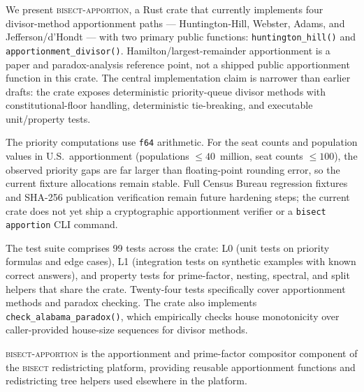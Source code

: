We present \textsc{bisect-apportion}, a Rust crate that currently implements
four divisor-method apportionment paths --- Huntington-Hill, Webster, Adams,
and Jefferson/d'Hondt --- with two primary public functions:
\texttt{huntington\_hill()} and \texttt{apportionment\_divisor()}.
Hamilton/largest-remainder apportionment is a paper and paradox-analysis
reference point, not a shipped public apportionment function in this crate.
The central implementation claim is narrower than earlier drafts: the crate
exposes deterministic priority-queue divisor methods with constitutional-floor
handling, deterministic tie-breaking, and executable unit/property tests.

The priority computations use \texttt{f64} arithmetic.
For the seat counts and population values in U.S.\ apportionment
(populations $\leq 40$~million, seat counts $\leq 100$), the observed
priority gaps are far larger than floating-point rounding error, so the
current fixture allocations remain stable.  Full Census Bureau regression
fixtures and SHA-256 publication verification remain future hardening steps;
the current crate does not yet ship a cryptographic apportionment verifier or
a \texttt{bisect apportion} CLI command.

The test suite comprises 99 tests across the crate:
L0 (unit tests on priority formulas and edge cases),
L1 (integration tests on synthetic examples with known correct answers),
and property tests for prime-factor, nesting, spectral, and split helpers that
share the crate.  Twenty-four tests specifically cover apportionment methods
and paradox checking.
The crate also implements \texttt{check\_alabama\_paradox()},
which empirically checks house monotonicity over caller-provided house-size
sequences for divisor methods.

\textsc{bisect-apportion} is the apportionment and prime-factor compositor
component of the \textsc{bisect} redistricting platform, providing reusable
apportionment functions and redistricting tree helpers used elsewhere in the
platform.
